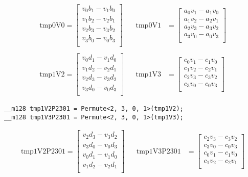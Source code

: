 \documentclass[fontsize = 10pt,DIV = 13]{scrartcl}
\begin{document}
\begin{align*}
\mathrm{tmp0V0} 
=
\begin{bmatrix}
v_0b_1 - v_1b_0\\
v_1b_2 - v_2b_1\\
v_2b_3 - v_3b_2\\
v_3b_0 - v_0b_3\\
\end{bmatrix}
&&
\mathrm{tmp0V1} 
&=
\begin{bmatrix}
a_0v_1 - a_1v_0\\
a_1v_2 - a_2v_1\\
a_2v_3 - a_3v_2\\
a_3v_0 - a_0v_3\\
\end{bmatrix}
\\
\\
\mathrm{tmp1V2} 
=
\begin{bmatrix}
v_0d_1 - v_1d_0\\
v_1d_2 - v_2d_1\\
v_2d_3 - v_3d_2\\
v_3d_0 - v_0d_3\\
\end{bmatrix}
&&
\mathrm{tmp1V3} 
&=
\begin{bmatrix}
c_0v_1 - c_1v_0\\
c_1v_2 - c_2v_1\\
c_2v_3 - c_3v_2\\
c_3v_0 - c_0v_3\\
\end{bmatrix}
\end{align*}

\begin{verbatim}
__m128 tmp1V2P2301 = Permute<2, 3, 0, 1>(tmp1V2);
__m128 tmp1V3P2301 = Permute<2, 3, 0, 1>(tmp1V3);
\end{verbatim}

\begin{align*}
\mathrm{tmp1V2P2301} 
=
\begin{bmatrix}
v_2d_3 - v_3d_2\\
v_3d_0 - v_0d_3\\
v_0d_1 - v_1d_0\\
v_1d_2 - v_2d_1\\
\end{bmatrix}
&&
\mathrm{tmp1V3P2301} 
&=
\begin{bmatrix}
c_2v_3 - c_3v_2\\
c_3v_0 - c_0v_3\\
c_0v_1 - c_1v_0\\
c_1v_2 - c_2v_1\\
\end{bmatrix}
\end{align*}
\end{document}
